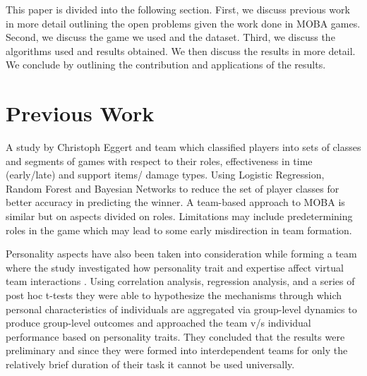 \documentclass[conference]{IEEEtran}
\begin{document}
This paper is divided into the following section. First, we discuss previous work in more detail outlining the open problems given the work done in MOBA games. Second, we discuss the game we used and the dataset. Third, we discuss the algorithms used and results obtained. We then discuss the results in more detail. We conclude by outlining the contribution and applications of the results.  

 


 








\section{Previous Work}
A study by Christoph Eggert and team \cite{Eggert2015} which classified players into sets of classes and segments of games with respect to their roles, effectiveness in time (early/late) and support items/ damage types. Using Logistic Regression, Random Forest and Bayesian Networks to reduce the set of player classes for better accuracy in predicting the winner. A team-based approach to MOBA is similar but on aspects divided on roles. Limitations may include predetermining roles in the game which may lead to some early misdirection in team formation.

 Personality aspects have also been taken into consideration while forming a team where the study investigated how personality trait and expertise affect virtual team interactions \cite{Balthazard2004}. Using correlation analysis, regression analysis, and a series of post hoc t-tests they were able to hypothesize the mechanisms through which personal characteristics of individuals are aggregated via group-level dynamics to produce group-level outcomes and approached the  team v/s individual performance based on personality traits. They concluded that the results were preliminary and since they were formed into interdependent teams for only the relatively brief duration of their task it cannot be used universally.
\end{document}
